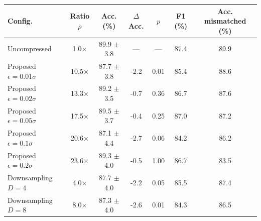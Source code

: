 \begin{tabular}{lcccccc}
\toprule
Config. & Ratio $\rho$ & Acc. (\%) & $\Delta$Acc. & $p$ & F1 (\%) & Acc. mismatched (\%) \\
\midrule
Uncompressed & 1.0$\times$ & 89.9 $\pm$ 3.8 & --- & --- & 87.4 & 89.9 \\
Proposed $\epsilon=0.01\sigma$ & 10.5$\times$ & 87.7 $\pm$ 3.8 & -2.2 & 0.01 & 85.4 & 88.6 \\
Proposed $\epsilon=0.02\sigma$ & 13.3$\times$ & 89.2 $\pm$ 3.5 & -0.7 & 0.36 & 86.7 & 87.6 \\
Proposed $\epsilon=0.05\sigma$ & 17.5$\times$ & 89.5 $\pm$ 3.7 & -0.4 & 0.25 & 87.0 & 87.2 \\
Proposed $\epsilon=0.1\sigma$ & 20.6$\times$ & 87.1 $\pm$ 4.4 & -2.7 & 0.06 & 84.2 & 86.2 \\
Proposed $\epsilon=0.2\sigma$ & 23.6$\times$ & 89.3 $\pm$ 4.0 & -0.5 & 1.00 & 86.7 & 83.5 \\
Downsampling $D=4$ & 4.0$\times$ & 87.7 $\pm$ 4.0 & -2.2 & 0.05 & 85.5 & 87.4 \\
Downsampling $D=8$ & 8.0$\times$ & 87.3 $\pm$ 4.0 & -2.6 & 0.01 & 84.3 & 86.5 \\
\bottomrule
\end{tabular}
